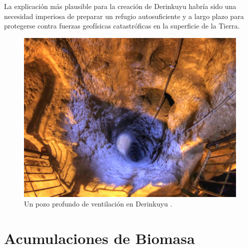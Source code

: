 \documentclass[10pt,twocolumn,letterpaper]{article}
\begin{document}
La explicación más plausible para la creación de Derinkuyu habría sido una necesidad imperiosa de preparar un refugio autosuficiente y a largo plazo para protegerse contra fuerzas geofísicas catastróficas en la superficie de la Tierra.

\begin{figure}[t]
\begin{center}
   \includegraphics[width=1\linewidth]{derinkuyu-air.jpg}
\end{center}
   \caption{Un pozo profundo de ventilación en Derinkuyu \cite{53}.}
\label{fig:6}
\label{fig:onecol}
\end{figure}


\section{Acumulaciones de Biomasa}
\end{document}
